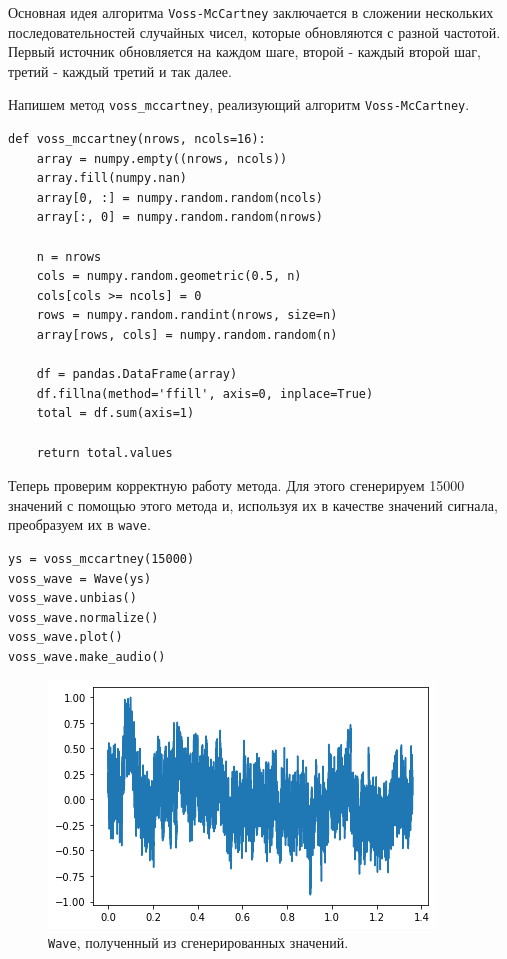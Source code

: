 \documentclass[a4paper, 14pt]{extarticle}
\begin{document}
    Основная идея алгоритма \texttt{Voss-McCartney} заключается в сложении нескольких последовательностей случайных
    чисел, которые обновляются с разной частотой. Первый источник обновляется на каждом шаге, второй - каждый второй шаг,
    третий - каждый третий и так далее.

    Напишем метод \texttt{voss\_mccartney}, реализующий алгоритм \texttt{Voss-McCartney}.

    \begin{lstlisting}[caption= Метод \texttt{voss\_mccartney}., label={lst:task5_voss_mccartney}]
def voss_mccartney(nrows, ncols=16):
    array = numpy.empty((nrows, ncols))
    array.fill(numpy.nan)
    array[0, :] = numpy.random.random(ncols)
    array[:, 0] = numpy.random.random(nrows)

    n = nrows
    cols = numpy.random.geometric(0.5, n)
    cols[cols >= ncols] = 0
    rows = numpy.random.randint(nrows, size=n)
    array[rows, cols] = numpy.random.random(n)

    df = pandas.DataFrame(array)
    df.fillna(method='ffill', axis=0, inplace=True)
    total = df.sum(axis=1)

    return total.values \end{lstlisting}

    Теперь проверим корректную работу метода. Для этого сгенерируем 15000 значений с помощью этого метода и, используя
    их в качестве значений сигнала, преобразуем их в \texttt{wave}.

    \begin{lstlisting}[caption= Генерация значений и их преобразование в \texttt{wave}., label={lst:task5_voss_mccartney}]
ys = voss_mccartney(15000)
voss_wave = Wave(ys)
voss_wave.unbias()
voss_wave.normalize()
voss_wave.plot()
voss_wave.make_audio()  \end{lstlisting}

    \begin{figure}[H]
        \centering
        \includegraphics[width=0.75\linewidth]{resources/Images/task5_voss_wave}
        \caption{\texttt{Wave}, полученный из сгенерированных значений.}
        \label{fig:task5_voss_wave}
    \end{figure}
\end{document}
